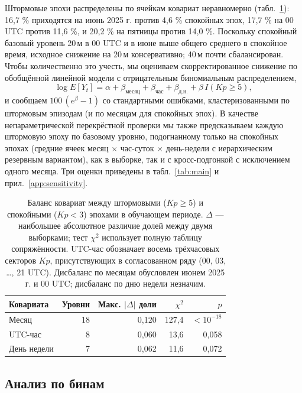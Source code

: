 \documentclass{agujournal2019}
\begin{document}
Штормовые эпохи распределены по ячейкам ковариат неравномерно
(табл.~\ref{tab:balance}): 16,7 \% приходятся на июнь 2025 г. против
4,6 \% спокойных эпох, 17,7 \% на 00 UTC против 11,6 \%, и 20,2 \% на пятницы
против 14,0 \%. Поскольку спокойный базовый уровень 20\,м в 00 UTC и в июне
выше общего среднего в спокойное время, исходное снижение на 20\,м консервативно;
40\,м почти сбалансирован. Чтобы количественно это учесть, мы оцениваем
скорректированное снижение по обобщённой линейной модели с отрицательным
биномиальным распределением,
\begin{equation}
	\log E[Y_t] = \alpha + \beta_{\mbox{месяц}} + \beta_{\mbox{час}}
	+ \beta_{\mbox{д.н.}} + \beta\, I(Kp \ge 5),
	\label{eq:glm}
\end{equation}
и сообщаем $100\,(e^{\beta}-1)$ со стандартными ошибками,
кластеризованными по штормовым эпизодам (и по месяцам для спокойных эпох).
В качестве непараметрической перекрёстной проверки мы также предсказываем
каждую штормовую эпоху по базовому уровню, подогнанному только на спокойных
эпохах (средние ячеек месяц $\times$ час-суток $\times$ день-недели
с иерархическим резервным вариантом), как в выборке, так и с кросс-подгонкой
с исключением одного месяца. Три оценки приведены в табл.~\ref{tab:main}
и прил.~\ref{app:sensitivity}.

\begin{table}[h]
	\centering
	\small
	\caption{Баланс ковариат между штормовыми ($Kp \ge 5$) и спокойными
		($Kp < 3$) эпохами в обучающем периоде. $\Delta$ — наибольшее
		абсолютное различие долей между двумя выборками; тест $\chi^2$
		использует полную таблицу сопряжённости. UTC-час обозначает восемь
		трёхчасовых секторов $Kp$, присутствующих в согласованном ряду
		(00, 03, \ldots, 21 UTC). Дисбаланс по месяцам обусловлен июнем
		2025 г. и 00 UTC; дисбаланс по дню недели незначим.}
	\label{tab:balance}
	\begin{tabular}{lrrrr}
		\toprule
		Ковариата & Уровни & Макс. $|\Delta|$ доли & $\chi^2$ & $p$ \\
		\midrule
		Месяц       & 18 & 0,120 & 127,4 & $<10^{-18}$ \\
		UTC-час     & 8  & 0,060 & 13,6  & 0,058 \\
		День недели & 7  & 0,062 & 11,6  & 0,072 \\
		\bottomrule
	\end{tabular}
\end{table}

\subsection{Анализ по бинам}
\end{document}
